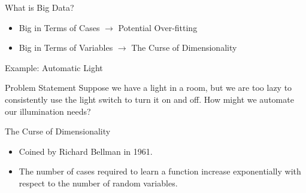 \documentclass[handout]{beamer}
\begin{document}
\begin{frame}{What is Big Data?}
    \begin{itemize}
        \item Big in Terms of Cases $\longrightarrow$ Potential Over-fitting
        \item Big in Terms of Variables $\longrightarrow$ The Curse of Dimensionality
    \end{itemize}
\end{frame}

\begin{frame}{Example: Automatic Light}
    \begin{block}{Problem Statement}
        Suppose we have a light in a room, but we are too lazy to consistently use the light switch to turn it on and off.
        How might we automate our illumination needs?
    \end{block}
\end{frame}

\begin{frame}{The Curse of Dimensionality}
    \begin{itemize}
        \item Coined by Richard Bellman in 1961.
        \item The number of cases required to learn a function increase exponentially with respect to the number of random variables.
    \end{itemize}
\end{frame}
\end{document}
